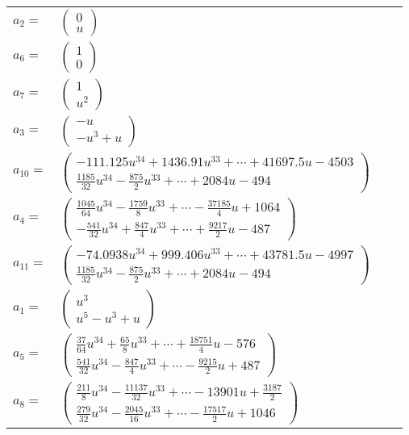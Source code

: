 \documentclass[1p]{elsarticle_modified}
\theoremstyle{definition}
\begin{document}
\begin{tabular}{m{7pt} m{180pt} m{7pt} m{180pt} }
\flushright $a_{2}=$&$\begin{pmatrix}0\\u\end{pmatrix}$ \\
\flushright $a_{6}=$&$\begin{pmatrix}1\\0\end{pmatrix}$ \\
\flushright $a_{7}=$&$\begin{pmatrix}1\\u^2\end{pmatrix}$ \\
\flushright $a_{3}=$&$\begin{pmatrix}- u\\- u^3+u\end{pmatrix}$ \\
\flushright $a_{10}=$&$\begin{pmatrix}-111.125 u^{34}+1436.91 u^{33}+\cdots+41697.5 u-4503\\\frac{1185}{32} u^{34}-\frac{875}{2} u^{33}+\cdots+2084 u-494\end{pmatrix}$ \\
\flushright $a_{4}=$&$\begin{pmatrix}\frac{1045}{64} u^{34}-\frac{1759}{8} u^{33}+\cdots-\frac{37185}{4} u+1064\\-\frac{541}{32} u^{34}+\frac{847}{4} u^{33}+\cdots+\frac{9217}{2} u-487\end{pmatrix}$ \\
\flushright $a_{11}=$&$\begin{pmatrix}-74.0938 u^{34}+999.406 u^{33}+\cdots+43781.5 u-4997\\\frac{1185}{32} u^{34}-\frac{875}{2} u^{33}+\cdots+2084 u-494\end{pmatrix}$ \\
\flushright $a_{1}=$&$\begin{pmatrix}u^3\\u^5- u^3+u\end{pmatrix}$ \\
\flushright $a_{5}=$&$\begin{pmatrix}\frac{37}{64} u^{34}+\frac{65}{8} u^{33}+\cdots+\frac{18751}{4} u-576\\\frac{541}{32} u^{34}-\frac{847}{4} u^{33}+\cdots-\frac{9215}{2} u+487\end{pmatrix}$ \\
\flushright $a_{8}=$&$\begin{pmatrix}\frac{211}{8} u^{34}-\frac{11137}{32} u^{33}+\cdots-13901 u+\frac{3187}{2}\\\frac{279}{32} u^{34}-\frac{2045}{16} u^{33}+\cdots-\frac{17517}{2} u+1046\end{pmatrix}$ \\

\end{tabular}
\end{document}
